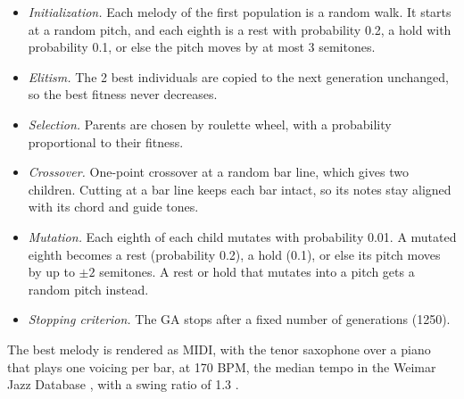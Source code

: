 \begin{itemize}
  \item \emph{Initialization.} Each melody of the first population is a random walk. It starts at a random pitch, and each eighth is a rest with probability 0.2, a hold with probability 0.1, or else the pitch moves by at most 3 semitones.
  \item \emph{Elitism.} The 2 best individuals are copied to the next generation unchanged, so the best fitness never decreases.
  \item \emph{Selection.} Parents are chosen by roulette wheel, with a probability proportional to their fitness.
  \item \emph{Crossover.} One-point crossover at a random bar line, which gives two children. Cutting at a bar line keeps each bar intact, so its notes stay aligned with its chord and guide tones.
  \item \emph{Mutation.} Each eighth of each child mutates with probability 0.01. A mutated eighth becomes a rest (probability 0.2), a hold (0.1), or else its pitch moves by up to $\pm 2$ semitones. A rest or hold that mutates into a pitch gets a random pitch instead.
  \item \emph{Stopping criterion.} The GA stops after a fixed number of generations (1250).
\end{itemize}

The best melody is rendered as MIDI, with the tenor saxophone over a piano that plays one voicing per bar, at 170 BPM, the median tempo in the Weimar Jazz Database \cite{pfleiderer2017}, with a swing ratio of 1.3 \cite{corcoran2021}.
